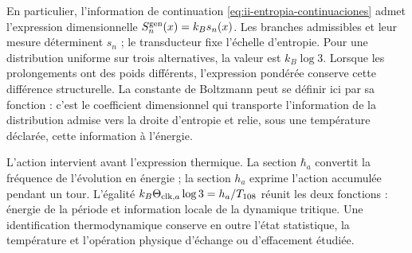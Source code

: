 En particulier, l’information de continuation
\eqref{eq:ii-entropia-continuaciones} admet l’expression dimensionnelle
\(S_n^{\rm gen}(x)=k_Bs_n(x)\). Les branches admissibles et leur mesure
déterminent \(s_n\) ; le transducteur fixe l’échelle d’entropie. Pour
une distribution uniforme sur trois alternatives, la valeur est
\(k_B\log3\). Lorsque les prolongements ont des poids différents,
l’expression pondérée conserve cette différence structurelle. La
constante de Boltzmann peut se définir ici par sa fonction : c’est le
coefficient dimensionnel qui transporte l’information de la
distribution admise vers la droite d’entropie et relie, sous une
température déclarée, cette information à l’énergie.

L’action intervient avant l’expression thermique. La section
\(\hbar_a\) convertit la fréquence de l’évolution en énergie ;
la section \(h_a\) exprime l’action accumulée pendant un tour.
L’égalité \(k_B\Theta_{{\rm clk},a}\log3=h_a/T_{108}\)
réunit les deux fonctions : énergie de la période et information locale de
la dynamique tritique. Une identification thermodynamique conserve
en outre l’état statistique, la température et l’opération physique
d’échange ou d’effacement étudiée.
